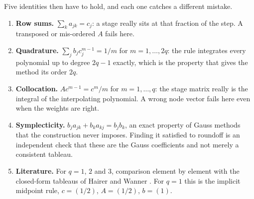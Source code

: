 \documentclass[11pt,a4paper]{article}
\begin{document}
Five identities then have to hold, and each one catches a different mistake.
\begin{enumerate}\setlength{\itemsep}{2pt}
  \item \textbf{Row sums.} $\sum_k a_{jk} = c_j$: a stage really sits at that
  fraction of the step. A transposed or mis-ordered $A$ fails here.
  \item \textbf{Quadrature.} $\sum_j b_j c_j^{m-1} = 1/m$ for $m = 1, \dots, 2q$:
  the rule integrates every polynomial up to degree $2q - 1$ exactly, which is
  the property that gives the method its order $2q$.
  \item \textbf{Collocation.} $A c^{m-1} = c^{m}/m$ for $m = 1, \dots, q$: the
  stage matrix really is the integral of the interpolating polynomial. A wrong
  node vector fails here even when the weights are right.
  \item \textbf{Symplecticity.} $b_j a_{jk} + b_k a_{kj} = b_j b_k$, an exact
  property of Gauss methods \citep{hairer2006} that the construction never
  imposes. Finding it satisfied to roundoff is an independent check that these
  are the Gauss coefficients and not merely a consistent tableau.
  \item \textbf{Literature.} For $q = 1$, $2$ and $3$, comparison element by
  element with the closed-form tableaus of Hairer and Wanner
  \citep[table~IV.5.2]{hairer1996}. For $q = 1$ this is the implicit midpoint
  rule, $c = (1/2)$, $A = (1/2)$, $b = (1)$.
\end{enumerate}
\end{document}

